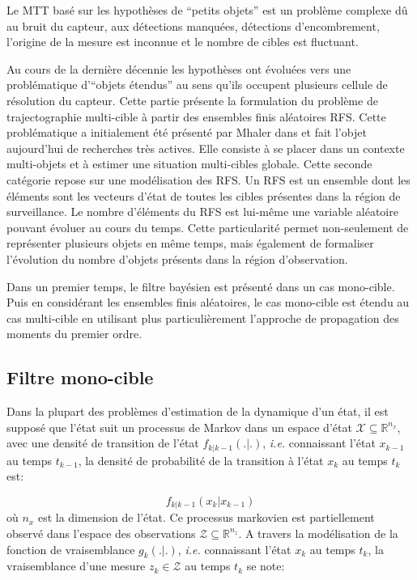 \documentclass[10pt,french,a4paper]{report}
\begin{document}
Le \ac{MTT} basé sur les hypothèses de ``petits objets'' est un problème complexe dû au bruit du capteur, aux détections manquées, détections d'encombrement, l'origine de la mesure est inconnue et le nombre de cibles est fluctuant. 

Au cours de la dernière décennie les hypothèses ont évoluées vers une problématique d'``objets étendus'' au sens qu'ils occupent plusieurs cellule de résolution du capteur. Cette partie présente la formulation du problème de trajectographie multi-cible à partir des ensembles finis aléatoires \acf{RFS}. Cette problématique a initialement été présenté par Mhaler dans \cite{Mahler2003} et fait l'objet aujourd'hui de recherches très actives. Elle consiste à se placer dans un contexte multi-objets et à estimer une  situation multi-cibles globale. Cette seconde catégorie repose sur une modélisation des \acf{RFS}. Un \ac{RFS} est un ensemble dont les éléments sont les vecteurs d'état de toutes les cibles présentes dans la région de surveillance. Le nombre d'éléments du \ac{RFS} est lui-même une variable aléatoire pouvant évoluer au cours du temps. Cette particularité permet non-seulement de représenter plusieurs objets en même temps, mais également de formaliser l'évolution du nombre d'objets présents dans la région d'observation. 

Dans un premier temps, le filtre bayésien est présenté dans un cas mono-cible. Puis en considérant les ensembles finis aléatoires, le cas mono-cible est étendu au cas multi-cible en utilisant plus particulièrement l'approche de propagation des moments du premier ordre.

\subsection{Filtre mono-cible} 
Dans la plupart des problèmes d'estimation de la dynamique d'un état, il est supposé que l'état suit un processus de Markov dans un espace d'état $\mathcal{X} \subseteq \mathbb{R}^{n_x}$, avec une densité de transition de l'état $f_{k|k-1}(.|.)$, \textit{i.e.} connaissant l'état $x_{k-1}$ au temps $t_{k-1}$, la densité de probabilité de la transition à l'état $x_{k}$ au temps $t_{k}$ est:
 
\begin{equation}
 f_{k|k-1}(x_{k}|x_{k-1})
 \label{f}
\end{equation}
où $n_x$ est la dimension de l'état. Ce processus markovien est partiellement observé dans l'espace des observations $\mathcal{Z} \subseteq \mathbb{R}^{n_z}$. A travers la modélisation de la fonction de vraisemblance $g_k(.|.)$, \textit{i.e.} connaissant l'état $x_{k}$ au temps $t_{k}$, la vraisemblance d'une mesure $z_k \in \mathcal{Z}$ au temps $t_k$ se note:
\end{document}
